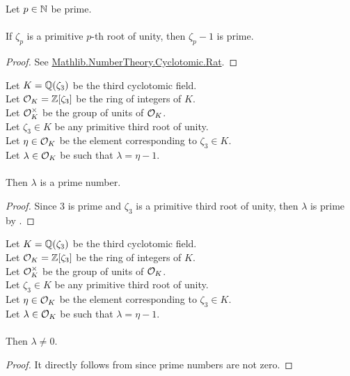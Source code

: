 \begin{theorem}
    \label{thm:zeta_sub_one_prime1}
    \leanok
    Let $p \in \mathbb{N}$ be prime. \\\\
    If $\zeta_p$ is a primitive $p$-th root of unity, then $\zeta_p - 1$ is prime.
\end{theorem}
\begin{proof}
    \leanok
    See \href{https://pitmonticone.github.io/FLT3/docs/FLT3/Mathlib/NumberTheory/Cyclotomic/Rat.html#IsPrimitiveRoot.zeta_sub_one_prime'}{Mathlib.NumberTheory.Cyclotomic.Rat}.
\end{proof}

\begin{lemma}
    \label{lmm:lambda_prime}
    \leanok
    Let $K = \mathbb{Q}(\zeta_3)$ be the third cyclotomic field. \\
    Let $\mathcal{O}_K = \mathbb{Z}[\zeta_3]$ be the ring of integers of $K$. \\
    Let $\mathcal{O}^\times_K$ be the group of units of $\mathcal{O}_K$. \\
    Let $\zeta_3 \in K$ be any primitive third root of unity. \\
    Let $\eta \in \mathcal{O}_K$ be the element corresponding to $\zeta_3 \in K$. \\
    Let $\lambda \in \mathcal{O}_K$ be such that $\lambda = \eta -1$. \\\\
    Then $\lambda$ is a prime number.
\end{lemma}
\begin{proof}
    \leanok
    Since $3$ is prime and $\zeta_3$ is a primitive third root of unity, then $\lambda$ is prime
    by .
\end{proof}

\begin{lemma}
    \label{lmm:lambda_ne_zero}
    \leanok
    Let $K = \mathbb{Q}(\zeta_3)$ be the third cyclotomic field. \\
    Let $\mathcal{O}_K = \mathbb{Z}[\zeta_3]$ be the ring of integers of $K$. \\
    Let $\mathcal{O}^\times_K$ be the group of units of $\mathcal{O}_K$. \\
    Let $\zeta_3 \in K$ be any primitive third root of unity. \\
    Let $\eta \in \mathcal{O}_K$ be the element corresponding to $\zeta_3 \in K$. \\
    Let $\lambda \in \mathcal{O}_K$ be such that $\lambda = \eta -1$. \\\\
    Then $\lambda \neq 0$.
\end{lemma}
\begin{proof}
    \leanok
    It directly follows from  since prime numbers are not zero.
\end{proof}

